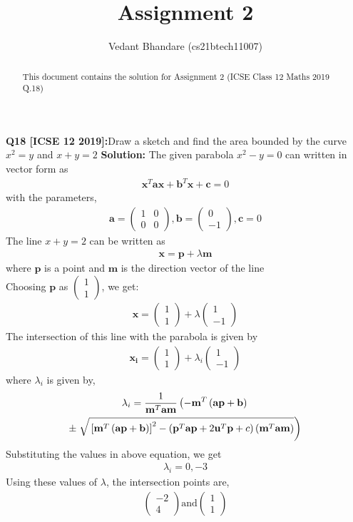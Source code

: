 \documentclass[journal,12pt,twocolumn]{IEEEtran}
\title{Assignment 2}
\author{ Vedant Bhandare (cs21btech11007)}
\providecommand{\sbrak}[1]{\ensuremath{{}\left[#1\right]}}
\providecommand{\brak}[1]{\ensuremath{\left(#1\right)}}
\providecommand{\lbrak}[1]{\ensuremath{\left(#1\right.}}
\providecommand{\rbrak}[1]{\ensuremath{\left.#1\right)}}
\theoremstyle{remark}
\newcommand{\myvec}[1]{\ensuremath{\begin{pmatrix}#1\end{pmatrix}}}
\let\vec\mathbf
\begin{document}
\maketitle
\begin{abstract}
This document contains the solution for Assignment 2 (ICSE Class 12 Maths 2019 Q.18)
\end{abstract}
\begin{flushleft}
\textbf{Q18 [ICSE 12 2019]:}Draw a sketch and find the area bounded by the curve $x^2 = y$ and $x + y = 2$
\textbf{Solution: } The given parabola $x^2 - y = 0$ can written in vector form as
\begin{align}
    \vec{x}^T\vec{a}\vec{x} + \vec{b}^T\vec{x} + \vec{c} = 0
\end{align}
with the parameters,
\begin{align}
    \vec{a} = \myvec{1 & 0 \\ 0 & 0}, \vec{b} = \myvec{0 \\ -1}, \vec{c} = 0
\end{align}
The line $x + y = 2$ can be written as
\begin{align}
    \vec{x} = \vec{p} + \lambda \vec{m}
\end{align}
where $\vec{p}$ is a point and $\vec{m}$ is the direction vector of the line\\
Choosing $\vec{p}$ as $\myvec{1 \\ 1}$, we get:
\begin{align}
    \vec{x} = \myvec{1 \\ 1} + \lambda \myvec{1 \\ -1}
\end{align}
The intersection of this line with the parabola is given by
\begin{align}
    \vec{x_i} = \myvec{1 \\ 1} + \lambda_i \myvec{1 \\ -1}
\end{align}
where $\lambda_i$ is given by,
\begin{multline}
\footnotesize
    \lambda_i = \frac{1}
{
\vec{m}^T\vec{a}\vec{m}
}
\lbrak{-\vec{m}^T\brak{\vec{a}\vec{p}+\vec{b}}}
\\
\pm
\rbrak{\sqrt{\sbrak{\vec{m}^T\brak{\vec{a}\vec{p}+\vec{b}}
}^2
-
\brak
{
\vec{p}^T\vec{a}\vec{p} + 2\vec{u}^T\vec{p} +c
}
\brak{\vec{m}^T\vec{a}\vec{m}}
}
}
\label{eq:tangent_roots}
\end{multline}
Substituting the values in above equation, we get
\begin{align}
    \lambda_i = 0, -3
\end{align}
Using these values of $\lambda$, the intersection points are,
\begin{align}
    \myvec{-2 \\ 4} \text{and} \myvec{1 \\ 1}
\end{align}


\end{flushleft}
\end{document}
